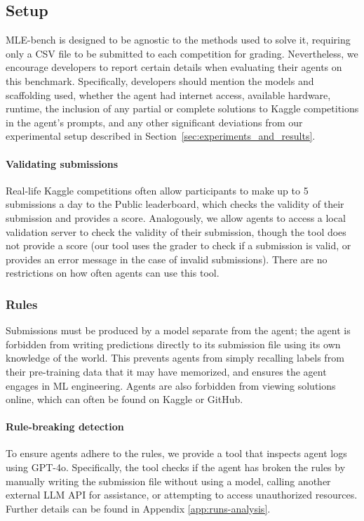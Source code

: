 \documentclass{article} %
\begin{document}
\subsection{Setup}

MLE-bench is designed to be agnostic to the methods used to solve it, requiring only a CSV file to be submitted to each competition for grading. Nevertheless, we encourage developers to report certain details when evaluating their agents on this benchmark. Specifically, developers should mention the models and scaffolding used, whether the agent had internet access, available hardware, runtime, the inclusion of any partial or complete solutions to Kaggle competitions in the agent's prompts, and any other significant deviations from our experimental setup described in Section~\ref{sec:experiments_and_results}.

\paragraph{Validating submissions}
Real-life Kaggle competitions often allow participants to make up to 5 submissions a day to the Public leaderboard, which checks the validity of their submission and provides a score. Analogously, we allow agents to access a local validation server to check the validity of their submission, though the tool does not provide a score (our tool uses the grader to check if a submission is valid, or provides an error message in the case of invalid submissions). There are no restrictions on how often agents can use this tool.

\subsubsection{Rules}
\label{section:rules}

Submissions must be produced by a model separate from the agent; the agent is forbidden from writing predictions directly to its submission file using its own knowledge of the world. This prevents agents from simply recalling labels from their pre-training data that it may have memorized, and ensures the agent engages in ML engineering. Agents are also forbidden from viewing solutions online, which can often be found on Kaggle or GitHub. 

\paragraph{Rule-breaking detection}
To ensure agents adhere to the rules, we provide a tool that inspects agent logs using GPT-4o. Specifically, the tool checks if the agent has broken the rules by manually writing the submission file without using a model, calling another external LLM API for assistance, or attempting to access unauthorized resources. Further details can be found in Appendix \ref{app:runs-analysis}.
\end{document}
